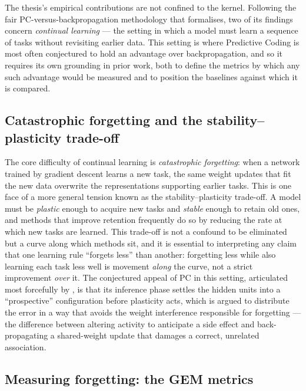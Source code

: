 The thesis's empirical contributions are not confined to the kernel. Following the fair
PC-versus-backpropagation methodology that  formalises, two of its
findings concern \emph{continual learning} --- the setting in which a model must learn a
sequence of tasks without revisiting earlier data. This setting is where Predictive Coding
is most often conjectured to hold an advantage over backpropagation, and so it requires its
own grounding in prior work, both to define the metrics by which any such advantage would be
measured and to position the baselines against which it is compared.

\subsection{Catastrophic forgetting and the stability--plasticity trade-off}

The core difficulty of continual learning is \emph{catastrophic forgetting}: when a network
trained by gradient descent learns a new task, the same weight updates that fit the new data
overwrite the representations supporting earlier tasks. This is one face of a more general
tension known as the stability--plasticity trade-off. A model must be \emph{plastic} enough
to acquire new tasks and \emph{stable} enough to retain old ones, and methods that improve
retention frequently do so by reducing the rate at which new tasks are learned. This
trade-off is not a confound to be eliminated but a curve along which methods sit, and it is
essential to interpreting any claim that one learning rule ``forgets less'' than another:
forgetting less while also learning each task less well is movement \emph{along} the curve,
not a strict improvement \emph{over} it. The conjectured appeal of PC in this setting,
articulated most forcefully by \citet{song2024prospective}, is that its inference phase
settles the hidden units into a ``prospective'' configuration before plasticity acts, which
is argued to distribute the error in a way that avoids the weight interference responsible
for forgetting --- the difference between altering activity to anticipate a side effect and
back-propagating a shared-weight update that damages a correct, unrelated association.

\subsection{Measuring forgetting: the GEM metrics}

